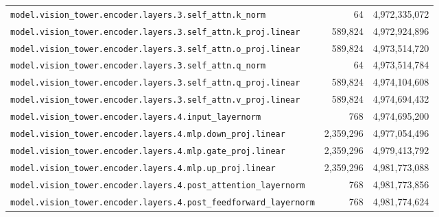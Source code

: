 \documentclass[10pt,a4paper]{article}
\theoremstyle{definition}
\begin{document}
\begin{appendices}
\begin{longtable}{p{9.5cm}rr}
\texttt{model.\allowbreak{}vision\_tower.\allowbreak{}encoder.\allowbreak{}layers.\allowbreak{}3.\allowbreak{}self\_attn.\allowbreak{}k\_norm} & 64 & 4,972,335,072 \\
\texttt{model.\allowbreak{}vision\_tower.\allowbreak{}encoder.\allowbreak{}layers.\allowbreak{}3.\allowbreak{}self\_attn.\allowbreak{}k\_proj.\allowbreak{}linear} & 589,824 & 4,972,924,896 \\
\texttt{model.\allowbreak{}vision\_tower.\allowbreak{}encoder.\allowbreak{}layers.\allowbreak{}3.\allowbreak{}self\_attn.\allowbreak{}o\_proj.\allowbreak{}linear} & 589,824 & 4,973,514,720 \\
\texttt{model.\allowbreak{}vision\_tower.\allowbreak{}encoder.\allowbreak{}layers.\allowbreak{}3.\allowbreak{}self\_attn.\allowbreak{}q\_norm} & 64 & 4,973,514,784 \\
\texttt{model.\allowbreak{}vision\_tower.\allowbreak{}encoder.\allowbreak{}layers.\allowbreak{}3.\allowbreak{}self\_attn.\allowbreak{}q\_proj.\allowbreak{}linear} & 589,824 & 4,974,104,608 \\
\texttt{model.\allowbreak{}vision\_tower.\allowbreak{}encoder.\allowbreak{}layers.\allowbreak{}3.\allowbreak{}self\_attn.\allowbreak{}v\_proj.\allowbreak{}linear} & 589,824 & 4,974,694,432 \\
\texttt{model.\allowbreak{}vision\_tower.\allowbreak{}encoder.\allowbreak{}layers.\allowbreak{}4.\allowbreak{}input\_layernorm} & 768 & 4,974,695,200 \\
\texttt{model.\allowbreak{}vision\_tower.\allowbreak{}encoder.\allowbreak{}layers.\allowbreak{}4.\allowbreak{}mlp.\allowbreak{}down\_proj.\allowbreak{}linear} & 2,359,296 & 4,977,054,496 \\
\texttt{model.\allowbreak{}vision\_tower.\allowbreak{}encoder.\allowbreak{}layers.\allowbreak{}4.\allowbreak{}mlp.\allowbreak{}gate\_proj.\allowbreak{}linear} & 2,359,296 & 4,979,413,792 \\
\texttt{model.\allowbreak{}vision\_tower.\allowbreak{}encoder.\allowbreak{}layers.\allowbreak{}4.\allowbreak{}mlp.\allowbreak{}up\_proj.\allowbreak{}linear} & 2,359,296 & 4,981,773,088 \\
\texttt{model.\allowbreak{}vision\_tower.\allowbreak{}encoder.\allowbreak{}layers.\allowbreak{}4.\allowbreak{}post\_attention\_layernorm} & 768 & 4,981,773,856 \\
\texttt{model.\allowbreak{}vision\_tower.\allowbreak{}encoder.\allowbreak{}layers.\allowbreak{}4.\allowbreak{}post\_feedforward\_layernorm} & 768 & 4,981,774,624 \\

\end{longtable}
\end{appendices}
\end{document}

